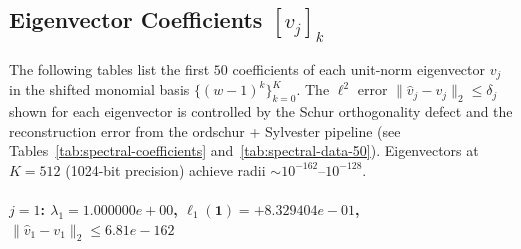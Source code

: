 \documentclass[11pt]{article}
\begin{document}
\clearpage
\subsection*{Eigenvector Coefficients $[v_j]_k$}

The following tables list the first $50$ coefficients of each unit-norm
eigenvector $v_j$ in the shifted monomial basis $\{(w-1)^k\}_{k=0}^{K}$.
The $\ell^2$ error $\|\hat{v}_j - v_j\|_2 \leq \delta_j$ shown for each
eigenvector is controlled by the Schur orthogonality defect and the
reconstruction error from the ordschur + Sylvester pipeline
(see Tables~\ref{tab:spectral-coefficients} and~\ref{tab:spectral-data-50}).
Eigenvectors at $K = 512$ (1024-bit precision) achieve radii $\sim 10^{-162}$--$10^{-128}$.

\paragraph{$j = 1$: $\lambda_{1} = 1.000000e+00$, \quad $\ell_{1}(\mathbf{1}) = +8.329404e-01$, \quad $\|\hat{v}_{1} - v_{1}\|_2 \leq 6.81e-162$}
\end{document}
